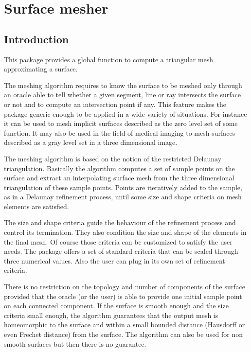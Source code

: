 \chapter{Surface mesher}
\label{chapter_SurfaceMesher}

\vspace*{-15mm}
\minitoc
\vspace*{30mm}

\section{Introduction}
\label{SurfaceMesher_section_intro}

This package provides a global function
to compute a triangular mesh approximating a surface.

The meshing algorithm requires to know the surface to be meshed
only  through an oracle able to  tell whether a
given segment, line or ray intersects the surface or not
and to compute an intersection point if any.
This feature makes the package generic enough to be
applied in a wide variety of situations. For instance it can be
used to mesh implicit surfaces described as the zero level set
of some function. It may also be used in the field of medical imaging
to mesh surfaces described as a gray
level set in a three dimensional image.


The meshing algorithm is based on the notion of the restricted
Delaunay triangulation. Basically the algorithm  computes a set of
sample points on the surface and extract an interpolating 
surface mesh  from the three dimensional triangulation of these 
sample points. Points are iteratively added to the sample,
as in a Delaunay refinement process, until some size and shape
criteria on mesh elements are satisfied. 


The size and shape criteria guide the  behaviour of
the refinement process and control its termination.
They also condition  the size and shape of the elements in the final
mesh. Of course those criteria can be customized to satisfy
the user needs. The  package offers
a set of standard criteria that can be scaled through
three numerical values. Also the user can plug in its own 
set of refinement criteria.

There is no restriction on the topology and number of components
of the surface provided that the oracle (or the user)
is able to provide one initial sample point on each connected component.
If the surface is smooth enough and the size criteria
small enough, the algorithm guarantees 
that the output mesh is homeomorphic to the
surface and within a small bounded distance
(Hausdorff or even Frechet distance) from the surface.
The algorithm can also be used for non smooth surfaces
but then there is no guarantee. 




